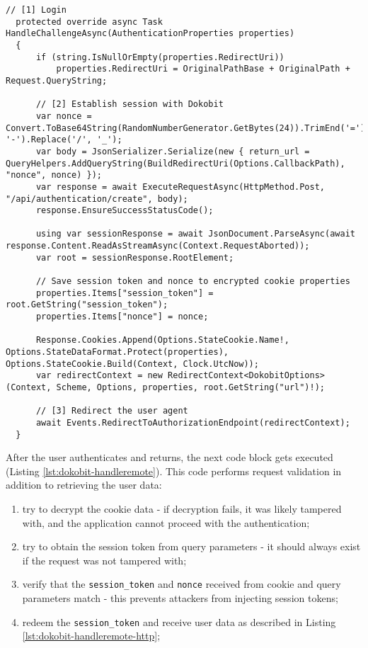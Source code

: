 \begin{lstlisting}[caption={Handling Dokobit session creation}, label={lst:dokobit-challenge}]
  // [1] Login
  protected override async Task HandleChallengeAsync(AuthenticationProperties properties)
  {
      if (string.IsNullOrEmpty(properties.RedirectUri))
          properties.RedirectUri = OriginalPathBase + OriginalPath + Request.QueryString;

      // [2] Establish session with Dokobit
      var nonce = Convert.ToBase64String(RandomNumberGenerator.GetBytes(24)).TrimEnd('=').Replace('+', '-').Replace('/', '_');
      var body = JsonSerializer.Serialize(new { return_url = QueryHelpers.AddQueryString(BuildRedirectUri(Options.CallbackPath), "nonce", nonce) });
      var response = await ExecuteRequestAsync(HttpMethod.Post, "/api/authentication/create", body);
      response.EnsureSuccessStatusCode();

      using var sessionResponse = await JsonDocument.ParseAsync(await response.Content.ReadAsStreamAsync(Context.RequestAborted));
      var root = sessionResponse.RootElement;

      // Save session token and nonce to encrypted cookie properties
      properties.Items["session_token"] = root.GetString("session_token");
      properties.Items["nonce"] = nonce;

      Response.Cookies.Append(Options.StateCookie.Name!, Options.StateDataFormat.Protect(properties), Options.StateCookie.Build(Context, Clock.UtcNow));
      var redirectContext = new RedirectContext<DokobitOptions>(Context, Scheme, Options, properties, root.GetString("url")!);

      // [3] Redirect the user agent
      await Events.RedirectToAuthorizationEndpoint(redirectContext);
  }
\end{lstlisting}

After the user authenticates and returns, the next code block gets executed (Listing \ref{lst:dokobit-handleremote}). This code performs request validation in addition to retrieving the user data:

\begin{enumerate}
  \item try to decrypt the cookie data - if decryption fails, it was likely tampered with, and the application cannot proceed with the authentication;
  \item try to obtain the session token from query parameters - it should always exist if the request was not tampered with;
  \item verify that the \texttt{session\_token} and \texttt{nonce} received from cookie and query parameters match - this prevents attackers from injecting session tokens;
  \item redeem the \texttt{session\_token} and receive user data as described in Listing \ref{lst:dokobit-handleremote-http};
\end{enumerate}

